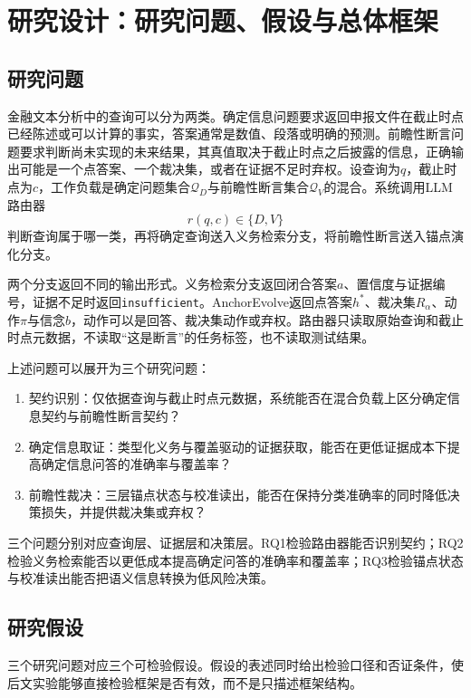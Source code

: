 \chapter{研究设计：研究问题、假设与总体框架}
\label{ch:framework}

\section{研究问题}

金融文本分析中的查询可以分为两类。确定信息问题要求返回申报文件在截止时点已经陈述或可以计算的事实，答案通常是数值、段落或明确的预测。前瞻性断言问题要求判断尚未实现的未来结果，其真值取决于截止时点之后披露的信息，正确输出可能是一个点答案、一个裁决集，或者在证据不足时弃权。设查询为$q$，截止时点为$c$，工作负载是确定问题集合$\mathcal Q_D$与前瞻性断言集合$\mathcal Q_V$的混合。系统调用LLM路由器
\begin{equation}
r(q,c)\in\{D,V\}
\end{equation}
判断查询属于哪一类，再将确定查询送入义务检索分支，将前瞻性断言送入锚点演化分支。

两个分支返回不同的输出形式。义务检索分支返回闭合答案$a$、置信度与证据编号，证据不足时返回\texttt{insufficient}。AnchorEvolve返回点答案$h^*$、裁决集$R_\alpha$、动作$\pi$与信念$b$，动作可以是回答、裁决集动作或弃权。路由器只读取原始查询和截止时点元数据，不读取“这是断言”的任务标签，也不读取测试结果。

上述问题可以展开为三个研究问题：
\begin{enumerate}[label=RQ\arabic*.,leftmargin=2em,itemsep=2pt,topsep=2pt]
\item 契约识别：仅依据查询与截止时点元数据，系统能否在混合负载上区分确定信息契约与前瞻性断言契约？
\item 确定信息取证：类型化义务与覆盖驱动的证据获取，能否在更低证据成本下提高确定信息问答的准确率与覆盖率？
\item 前瞻性裁决：三层锚点状态与校准读出，能否在保持分类准确率的同时降低决策损失，并提供裁决集或弃权？
\end{enumerate}
三个问题分别对应查询层、证据层和决策层。RQ1检验路由器能否识别契约；RQ2检验义务检索能否以更低成本提高确定问答的准确率和覆盖率；RQ3检验锚点状态与校准读出能否把语义信息转换为低风险决策。

\section{研究假设}

三个研究问题对应三个可检验假设。假设的表述同时给出检验口径和否证条件，使后文实验能够直接检验框架是否有效，而不是只描述框架结构。

